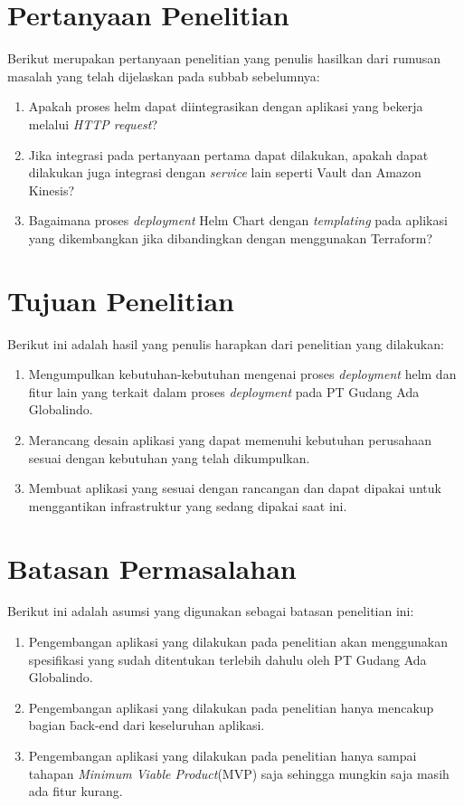 \section{Pertanyaan Penelitian}
\label{sec:pertanyaan Penelitian}
Berikut merupakan pertanyaan penelitian yang penulis hasilkan dari rumusan masalah yang telah dijelaskan pada subbab sebelumnya:
\begin{enumerate}
    \item Apakah proses \deployment helm dapat diintegrasikan dengan aplikasi yang bekerja melalui \textit{HTTP request}?
    \item Jika integrasi pada pertanyaan pertama dapat dilakukan, apakah dapat dilakukan juga integrasi dengan \textit{service} lain seperti Vault dan Amazon Kinesis?
    \item Bagaimana proses \textit{deployment} Helm Chart dengan \textit{templating} pada aplikasi yang dikembangkan jika dibandingkan dengan menggunakan Terraform?
\end{enumerate}
\section{Tujuan Penelitian}
\label{sec:tujuamPenelitian}
Berikut ini adalah hasil yang penulis harapkan dari penelitian yang dilakukan:
\begin{enumerate}
	\item Mengumpulkan kebutuhan-kebutuhan mengenai proses \textit{deployment} helm dan fitur lain yang terkait dalam proses \textit{deployment} pada PT Gudang Ada Globalindo.
	\item Merancang desain aplikasi yang dapat memenuhi kebutuhan perusahaan sesuai dengan kebutuhan yang telah dikumpulkan.
	\item Membuat aplikasi yang sesuai dengan rancangan dan dapat dipakai untuk menggantikan infrastruktur yang sedang dipakai saat ini.
\end{enumerate}

\section{Batasan Permasalahan}
\label{sec:batasanMasalah}
Berikut ini adalah asumsi yang digunakan sebagai batasan penelitian ini:
\begin{enumerate}
	\item Pengembangan aplikasi yang dilakukan pada penelitian akan menggunakan spesifikasi yang sudah ditentukan terlebih dahulu oleh PT Gudang Ada Globalindo.
	\item Pengembangan aplikasi yang dilakukan pada penelitian hanya mencakup bagian \f{back-end} dari keseluruhan aplikasi.
	\item Pengembangan aplikasi yang dilakukan pada penelitian hanya sampai tahapan \textit{Minimum Viable Product}(MVP) saja sehingga mungkin saja masih ada fitur kurang.
\end{enumerate}

